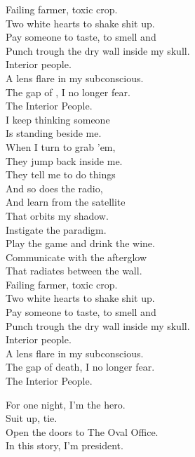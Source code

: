 Failing farmer, toxic crop. \\
Two white hearts to shake shit up. \\
Pay someone to taste, to smell and \\
Punch trough the dry wall inside my skull. \\

Interior people. \\
A lens flare in my subconscious. \\
The gap of , I no longer fear. \\
The Interior People. \\

I keep thinking someone \\
Is standing beside me. \\
When I turn to grab 'em, \\
They jump back inside me. \\
They tell me to do things \\
And so does the radio, \\
And learn from the satellite \\
That orbits my shadow. \\

Instigate the paradigm. \\
Play the game and drink the wine. \\
Communicate with the afterglow \\
That radiates between the wall. \\

Failing farmer, toxic crop. \\
Two white hearts to shake shit up. \\
Pay someone to taste, to smell and \\
Punch trough the dry wall inside my skull. \\

Interior people. \\
A lens flare in my subconscious. \\
The gap of death, I no longer fear. \\
The Interior People. \\





For one night, I'm the hero. \\
Suit up, tie. \\
Open the doors to The Oval Office. \\
In this story, I'm president. \\

